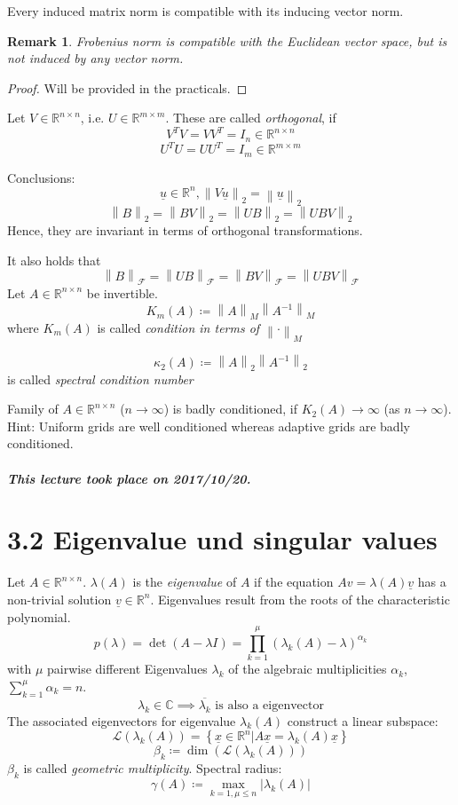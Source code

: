 \documentclass{article}
\newtheorem*{remark}{Remark}
\newcommand{\setdef}[2]{\left\{#1|#2\right\}}
\newcommand{\card}[1]{\left|#1\right|}
\newcommand{\norm}[1]{\left\|#1\right\|}
\newcommand{\dateref}[1]{\paragraph{\textit{This lecture took place on #1.}}}
\DeclareMathOperator{\detm}{det}
\begin{document}
Every induced matrix norm is compatible with its inducing vector norm.

\begin{remark}
  Frobenius norm is compatible with the Euclidean vector space,
  but is not induced by \emph{any} vector norm.
\end{remark}
\begin{proof}
  Will be provided in the practicals.
\end{proof}

Let $V \in \mathbb R^{n \times n}$, i.e. $U \in \mathbb R^{m \times m}$.
These are called \emph{orthogonal}, if
\[ V^T V = VV^T = I_n \in \mathbb R^{n \times n} \]
\[ U^T U = UU^T = I_m \in \mathbb R^{m \times m} \]

Conclusions:
\[ \underline{u} \in \mathbb R^n, \norm{V \underline{u}}_2 = \norm{\underline{u}}_2 \]
\[ \norm{B}_2 = \norm{BV}_2 = \norm{UB}_2 = \norm{UBV}_2 \]
Hence, they are invariant in terms of orthogonal transformations.

It also holds that
\[ \norm{B}_{\mathcal F} = \norm{UB}_{\mathcal F} = \norm{BV}_{\mathcal F} = \norm{UBV}_{\mathcal F} \]
Let $A \in \mathbb R^{n \times n}$ be invertible.
\[ K_m(A) \coloneqq \norm{A}_{M} \norm{A^{-1}}_M \]
where $K_m(A)$ is called \emph{condition in terms of $\norm{\cdot}_M$}

\[ \kappa_2(A) \coloneqq \norm{A}_2 \norm{A^{-1}}_2 \]
is called \emph{spectral condition number}

Family of $A \in \mathbb R^{n \times n}$ ($n \to \infty$) is badly conditioned, if $K_2(A) \to \infty$ (as $n \to \infty$).
Hint: Uniform grids are well conditioned whereas adaptive grids are badly conditioned.

\dateref{2017/10/20}

\section{3.2 Eigenvalue und singular values}
Let $A \in \mathbb R^{n\times n}$. $\lambda(A)$ is the \emph{eigenvalue} of $A$ if the equation $Av = \lambda(A) \underline{v}$
has a non-trivial solution $\underline{v} \in \mathbb R^n$.
Eigenvalues result from the roots of the characteristic polynomial.
\[ p(\lambda) = \detm{(A - \lambda I)} = \prod_{k=1}^\mu (\lambda_k(A) - \lambda)^{\alpha_k} \]
with $\mu$ pairwise different Eigenvalues $\lambda_k$ of the algebraic multiplicities $\alpha_k$, $\sum_{k=1}^\mu \alpha_k = n$.
\[ \lambda_k \in \mathbb C \implies \overline{\lambda_k} \text{ is also a eigenvector} \]
The associated eigenvectors for eigenvalue $\lambda_k(A)$ construct a linear subspace:
\[ \mathcal L(\lambda_k(A)) = \setdef{\underline{x} \in \mathbb R^n}{A\underline{x} = \lambda_k(A) \underline{x}} \]
\[ \beta_k \coloneqq \dim(\mathcal L(\lambda_k(A))) \]
$\beta_k$ is called \emph{geometric multiplicity}.
Spectral radius:
\[ \gamma(A) \coloneqq \max_{k=1,\mu\leq n} \card{\lambda_k(A)} \]
\end{document}

